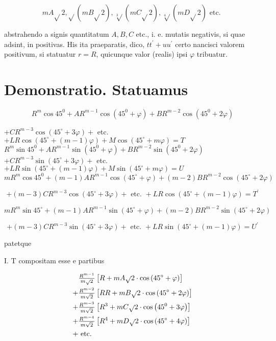 \documentclass[twoside,12pt, showframe]{memoir}
\let\oldfrac\frac
\def\frac#1#2{\mathchoice{\tfrac{#1}{#2}}{\oldfrac{#1}{#2}}{\genfrac{}{}{}{2}{#1}{#2\mathstrut}}{\genfrac{}{}{}{3}{#1}{#2\mathstrut}}}
\begin{document}
\[
m A \sqrt{ } 2, \sqrt{ }(m B \sqrt{ } 2), \sqrt[3]{ }(m C \sqrt{ } 2), \sqrt[4]{ }(m D \sqrt{ } 2) \text { etc. }
\]

abstrahendo a signis quantitatum \(A, B, C\) etc., i. e. mutatis negativis, si quae adsint, in positivas. His ita praeparatis, dico, \(t t^{\prime}+u u^{\prime}\) certo nancisci valorem positivum, si statuatur \(r=R\), quicunque valor (realis) ipsi \(\varphi\) tribuatur.

\section*{Demonstratio. Statuamus}
\[
R^{m} \cos 45^{0}+A R^{m-1} \cos \left(45^{0}+\varphi\right)+B R^{m-2} \cos \left(45^{0}+2 \varphi\right)
\]

\(+C R^{m-3} \cos \left(45^{\circ}+3 \varphi\right)+\) etc. \(+L R \cos \left(45^{\circ}+(m-1) \varphi\right)+M \cos \left(45^{\circ}+m \varphi\right)=T\) \(R^{m} \sin 45^{0}+A R^{m-1} \sin \left(45^{0}+\varphi\right)+B R^{m-2} \sin \left(45^{0}+2 \varphi\right)\) \(+C R^{m-3} \sin \left(45^{\circ}+3 \varphi\right)+\) etc. \(+L R \sin \left(45^{\circ}+(m-1) \varphi\right)+M \sin \left(45^{\circ}+m \varphi\right)=U\) \(m R^{m} \cos 45^{0}+(m-1) A R^{m-1} \cos \left(45^{\circ}+\varphi\right)+(m-2) B R^{m-2} \cos \left(45^{\circ}+2 \varphi\right)\)

\[
+(m-3) C R^{m-3} \cos \left(45^{\circ}+3 \varphi\right)+\text { etc. }+L R \cos \left(45^{\circ}+(m-1) \varphi\right)=T^{\prime}
\]

\(m R^{m} \sin 45^{\circ}+(m-1) A R^{m-1} \sin \left(45^{\circ}+\varphi\right)+(m-2) B R^{m-2} \sin \left(45^{\circ}+2 \varphi\right)\)

\[
+(m-3) C R^{m-3} \sin \left(45^{\circ}+3 \varphi\right)+\text { etc. }+L R \sin \left(45^{\circ}+(m-1) \varphi\right)=U^{\prime}
\]

patetque

I. T compositam esse e partibus

\[
\begin{aligned}
& \frac{R^{m-1}}{m \sqrt{ } 2}\left[R+m A \sqrt{ } 2 \cdot \cos \left(45^{\circ}+\varphi\right)\right] \\
+ & \frac{R^{m-2}}{m \sqrt{2}}\left[R R+m B \sqrt{ } 2 \cdot \cos \left(45^{\circ}+2 \varphi\right)\right] \\
+ & \frac{R^{m-3}}{m \sqrt{2}}\left[R^{3}+m C \sqrt{ } 2 \cdot \cos \left(45^{0}+3 \varphi\right)\right] \\
+ & \frac{R^{m-4}}{m \sqrt{2}}\left[R^{4}+m D \sqrt{ } 2 \cdot \cos \left(45^{\circ}+4 \varphi\right)\right] \\
+ & \text { etc. }
\end{aligned}
\]
\end{document}
